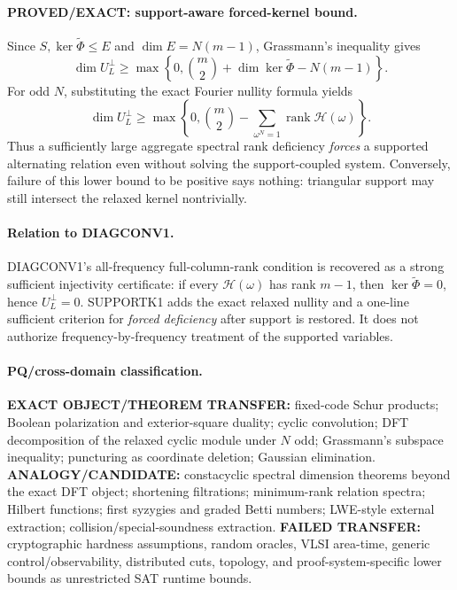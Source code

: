 \documentclass[11pt]{article}
\begin{document}
\paragraph{PROVED/EXACT: support-aware forced-kernel bound.}
Since $S,\ker\widetilde\Phi\le E$ and $\dim E=N(m-1)$, Grassmann's inequality gives
\[
\boxed{
\dim U_L^\perp
\ge
\max\left\{0,\binom m2+
\dim\ker\widetilde\Phi-N(m-1)\right\}.
}
\]
For odd $N$, substituting the exact Fourier nullity formula yields
\[
\boxed{
\dim U_L^\perp\ge
\max\left\{0,\binom m2-
\sum_{\omega^N=1}\operatorname{rank}\mathcal H(\omega)\right\}.
}
\]
Thus a sufficiently large aggregate spectral rank deficiency \emph{forces} a supported alternating relation even without solving the support-coupled system. Conversely, failure of this lower bound to be positive says nothing: triangular support may still intersect the relaxed kernel nontrivially.

\paragraph{Relation to DIAGCONV1.}
DIAGCONV1's all-frequency full-column-rank condition is recovered as a strong sufficient injectivity certificate: if every $\mathcal H(\omega)$ has rank $m-1$, then $\ker\widetilde\Phi=0$, hence $U_L^\perp=0$. SUPPORTK1 adds the exact relaxed nullity and a one-line sufficient criterion for \emph{forced deficiency} after support is restored. It does not authorize frequency-by-frequency treatment of the supported variables.

\paragraph{PQ/cross-domain classification.}
\textbf{EXACT OBJECT/THEOREM TRANSFER:} fixed-code Schur products; Boolean polarization and exterior-square duality; cyclic convolution; DFT decomposition of the relaxed cyclic module under $N$ odd; Grassmann's subspace inequality; puncturing as coordinate deletion; Gaussian elimination.
\textbf{ANALOGY/CANDIDATE:} constacyclic spectral dimension theorems beyond the exact DFT object; shortening filtrations; minimum-rank relation spectra; Hilbert functions; first syzygies and graded Betti numbers; LWE-style external extraction; collision/special-soundness extraction.
\textbf{FAILED TRANSFER:} cryptographic hardness assumptions, random oracles, VLSI area-time, generic control/observability, distributed cuts, topology, and proof-system-specific lower bounds as unrestricted SAT runtime bounds.
\end{document}
